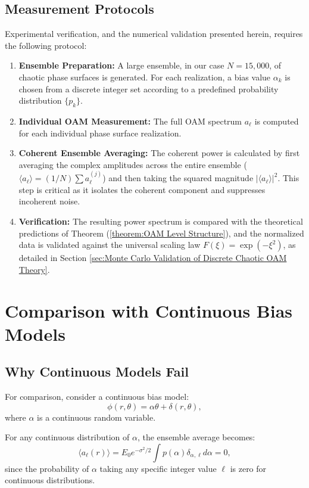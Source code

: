 \documentclass[a4paper,12pt]{article}
\newcommand{\ev}[1]{\langle #1 \rangle}
\begin{document}
\subsection{Measurement Protocols}
Experimental verification, and the numerical validation presented herein, requires the following protocol:
\begin{enumerate}
    \item \textbf{Ensemble Preparation:} A large ensemble, in our case $N = 15,000$, of chaotic phase 
	surfaces is generated. For each realization, a bias value $\alpha_k$ is chosen from a discrete 
	integer set according to a predefined probability distribution $\{p_k\}$.
    \item \textbf{Individual OAM Measurement:} The full OAM spectrum $a_\ell$ is computed for each 
	individual phase surface realization.
    \item \textbf{Coherent Ensemble Averaging:} The coherent power is calculated by first averaging 
	the complex amplitudes across the entire ensemble ($\ev{a_\ell} = (1/N) \sum a_\ell^{(j)}$) and 
	then taking the squared magnitude $|\ev{a_\ell}|^2$. This step is critical as it isolates the 
	coherent component and suppresses incoherent noise.
    \item \textbf{Verification:} The resulting power spectrum is compared with the theoretical 
	predictions of Theorem (\ref{theorem:OAM Level Structure}), and the normalized data is validated against 
	the universal 
	scaling law $F(\xi) = \exp(-\xi^2)$, as detailed in Section 
	\ref{sec:Monte Carlo Validation of Discrete Chaotic OAM Theory}.
\end{enumerate}


\section{Comparison with Continuous Bias Models}

\subsection{Why Continuous Models Fail}
For comparison, consider a continuous bias model:
\begin{equation}
    \phi(r,\theta) = \alpha \theta + \delta(r,\theta),
\end{equation}
where $\alpha$ is a continuous random variable.

For any continuous distribution of $\alpha$, the ensemble average becomes:
\begin{equation}
    \ev{a_\ell(r)} = E_0 e^{-\sigma^2/2} \int p(\alpha) \delta_{\alpha,\ell} d\alpha = 0,
\end{equation}
since the probability of $\alpha$ taking any specific integer value $\ell$ is zero for continuous distributions.
\end{document}
